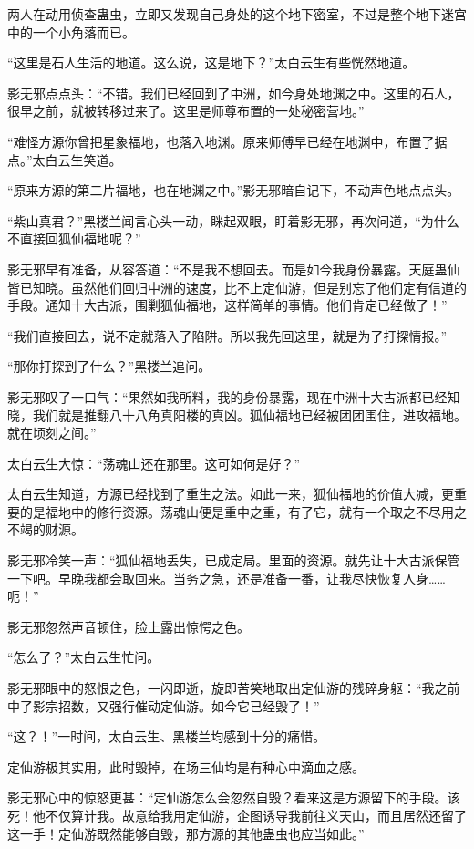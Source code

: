 \begin{this_body}
两人在动用侦查蛊虫，立即又发现自己身处的这个地下密室，不过是整个地下迷宫中的一个小角落而已。

“这里是石人生活的地道。这么说，这是地下？”太白云生有些恍然地道。

影无邪点点头：“不错。我们已经回到了中洲，如今身处地渊之中。这里的石人，很早之前，就被转移过来了。这里是师尊布置的一处秘密营地。”

“难怪方源你曾把星象福地，也落入地渊。原来师傅早已经在地渊中，布置了据点。”太白云生笑道。

“原来方源的第二片福地，也在地渊之中。”影无邪暗自记下，不动声色地点点头。

“紫山真君？”黑楼兰闻言心头一动，眯起双眼，盯着影无邪，再次问道，“为什么不直接回狐仙福地呢？”

影无邪早有准备，从容答道：“不是我不想回去。而是如今我身份暴露。天庭蛊仙皆已知晓。虽然他们回归中洲的速度，比不上定仙游，但是别忘了他们定有信道的手段。通知十大古派，围剿狐仙福地，这样简单的事情。他们肯定已经做了！”

“我们直接回去，说不定就落入了陷阱。所以我先回这里，就是为了打探情报。”

“那你打探到了什么？”黑楼兰追问。

影无邪叹了一口气：“果然如我所料，我的身份暴露，现在中洲十大古派都已经知晓，我们就是推翻八十八角真阳楼的真凶。狐仙福地已经被团团围住，进攻福地。就在顷刻之间。”

太白云生大惊：“荡魂山还在那里。这可如何是好？”

太白云生知道，方源已经找到了重生之法。如此一来，狐仙福地的价值大减，更重要的是福地中的修行资源。荡魂山便是重中之重，有了它，就有一个取之不尽用之不竭的财源。

影无邪冷笑一声：“狐仙福地丢失，已成定局。里面的资源。就先让十大古派保管一下吧。早晚我都会取回来。当务之急，还是准备一番，让我尽快恢复人身……呃！”

影无邪忽然声音顿住，脸上露出惊愕之色。

“怎么了？”太白云生忙问。

影无邪眼中的怒恨之色，一闪即逝，旋即苦笑地取出定仙游的残碎身躯：“我之前中了影宗招数，又强行催动定仙游。如今它已经毁了！”

“这？！”一时间，太白云生、黑楼兰均感到十分的痛惜。

定仙游极其实用，此时毁掉，在场三仙均是有种心中滴血之感。

影无邪心中的惊怒更甚：“定仙游怎么会忽然自毁？看来这是方源留下的手段。该死！他不仅算计我。故意给我用定仙游，企图诱导我前往义天山，而且居然还留了这一手！定仙游既然能够自毁，那方源的其他蛊虫也应当如此。”


\end{this_body}
